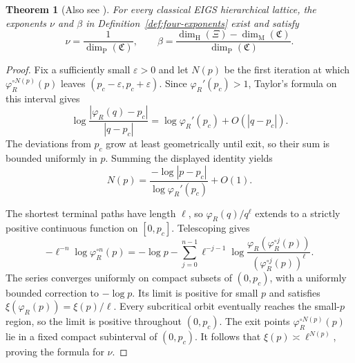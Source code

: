 \documentclass[scheme=plain,11pt]{ctexart}
\newtheorem{theorem}{Theorem}[section]
\theoremstyle{definition}
\theoremstyle{remark}
\newcommand{\dimhaus}{\dim_{\mathrm H}}
\newcommand{\dimmass}{\dim_{\mathrm M}}
\begin{document}
\begin{theorem}[Also see \cite{alves2026percolation}]\label{thm:critical-exponents-dimensions}
For every classical EIGS hierarchical lattice, the exponents $\nu$ and $\beta$ in Definition~\ref{def:four-exponents} exist and satisfy
\[
 \nu=\frac1{\dim_{\mathrm P}(\mathfrak C)},
 \qquad
 \beta=\frac{\dimhaus(\Xi)-\dimmass(\mathfrak C)}{\dim_{\mathrm P}(\mathfrak C)}.
\]
\end{theorem}
\begin{proof}
Fix a sufficiently small $\varepsilon>0$ and let $N(p)$ be the first iteration at which $\varphi_R^{\circ N(p)}(p)$ leaves $(p_c-\varepsilon,p_c+\varepsilon)$.
Since $\varphi_R'(p_c)>1$, Taylor's formula on this interval gives
\[
 \log\frac{|\varphi_R(q)-p_c|}{|q-p_c|}
 =\log\varphi_R'(p_c)+O(|q-p_c|).
\]
The deviations from $p_c$ grow at least geometrically until exit, so their sum is bounded uniformly in $p$.
Summing the displayed identity yields
\begin{equation}\label{eq:critical-escape-time}
 N(p)=\frac{-\log|p-p_c|}{\log\varphi_R'(p_c)}+O(1).
\end{equation}

The shortest terminal paths have length $\ell$, so $\varphi_R(q)/q^\ell$ extends to a strictly positive continuous function on $[0,p_c]$.
Telescoping gives
\[
 -\ell^{-n}\log\varphi_R^{\circ n}(p)
 =-\log p-\sum_{j=0}^{n-1}\ell^{-j-1}
 \log\frac{\varphi_R(\varphi_R^{\circ j}(p))}
 {(\varphi_R^{\circ j}(p))^\ell}.
\]
The series converges uniformly on compact subsets of $(0,p_c)$, with a uniformly bounded correction to $-\log p$.
Its limit is positive for small $p$ and satisfies $\xi(\varphi_R(p))=\xi(p)/\ell$.
Every subcritical orbit eventually reaches the small-$p$ region, so the limit is positive throughout $(0,p_c)$.
The exit points $\varphi_R^{\circ N(p)}(p)$ lie in a fixed compact subinterval of $(0,p_c)$.
It follows that $\xi(p)\asymp\ell^{N(p)}$, proving the formula for $\nu$.


\end{proof}
\end{document}
